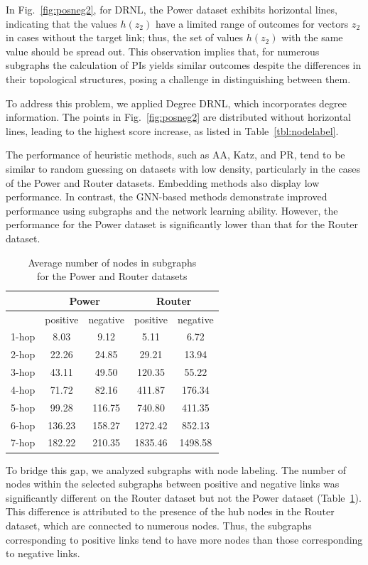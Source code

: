In Fig.~\ref{fig:posneg2}, for DRNL, the Power dataset exhibits horizontal lines, indicating that the values $h(z_2)$ have a limited range of outcomes for vectors $z_2$ in cases without the target link; thus, the set of values $h(z_2)$ with the same value should be spread out.
This observation implies that, for numerous subgraphs the calculation of PIs yields similar outcomes despite the differences in their topological structures, posing a challenge in distinguishing between them.

To address this problem, we applied Degree DRNL, which incorporates degree information. 
The points in Fig.~\ref{fig:posneg2} are distributed without horizontal lines, leading to the highest score increase, as listed in Table~\ref{tbl:nodelabel}.

The performance of heuristic methods, such as AA, Katz, and PR, tend to be similar to random guessing on datasets with low density, particularly in the cases of the Power and Router datasets. 
Embedding methods also display low performance. 
In contrast, the GNN-based methods demonstrate improved performance using subgraphs and the network learning ability.
However, the performance for the Power dataset is significantly lower than that for the Router dataset. 

\begin{table}[h!]
\centering
\caption{Average number of nodes in subgraphs \\for the Power and Router datasets}
\label{tab:num_nodes}
\begin{tabular}{l|cc|cc}
\toprule
& \multicolumn{2}{c|}{Power} & \multicolumn{2}{c}{Router} \\
\midrule
& positive & negative & positive & negative \\
\midrule
1-hop & 8.03 & 9.12 & 5.11 & 6.72 \\
2-hop & 22.26 & 24.85 & 29.21 & 13.94 \\
3-hop & 43.11 & 49.50 & 120.35 & 55.22 \\
4-hop & 71.72 & 82.16 & 411.87 & 176.34 \\
5-hop & 99.28 & 116.75 & 740.80 & 411.35 \\
6-hop & 136.23 & 158.27 & 1272.42 & 852.13 \\
7-hop & 182.22 & 210.35 & 1835.46 & 1498.58 \\
\bottomrule
\end{tabular}
\end{table}

To bridge this gap, we analyzed subgraphs with node labeling. 
The number of nodes within the selected subgraphs between positive and negative links was significantly different on the Router dataset but not the Power dataset (Table~\ref{tab:num_nodes}). 
This difference is attributed to the presence of the hub nodes in the Router dataset, which are connected to numerous nodes. 
Thus, the subgraphs corresponding to positive links tend to have more nodes than those corresponding to negative links. 

